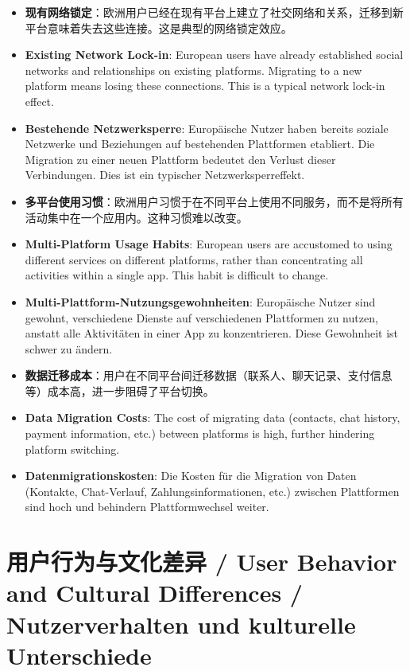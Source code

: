 \documentclass[11pt,a4paper]{article}
\begin{document}
\begin{itemize}
    \item \textbf{现有网络锁定}：欧洲用户已经在现有平台上建立了社交网络和关系，迁移到新平台意味着失去这些连接。这是典型的网络锁定效应。
    \item \textbf{Existing Network Lock-in}: European users have already established social networks and relationships on existing platforms. Migrating to a new platform means losing these connections. This is a typical network lock-in effect.
    \item \textbf{Bestehende Netzwerksperre}: Europäische Nutzer haben bereits soziale Netzwerke und Beziehungen auf bestehenden Plattformen etabliert. Die Migration zu einer neuen Plattform bedeutet den Verlust dieser Verbindungen. Dies ist ein typischer Netzwerksperreffekt.
    
    \item \textbf{多平台使用习惯}：欧洲用户习惯于在不同平台上使用不同服务，而不是将所有活动集中在一个应用内。这种习惯难以改变。
    \item \textbf{Multi-Platform Usage Habits}: European users are accustomed to using different services on different platforms, rather than concentrating all activities within a single app. This habit is difficult to change.
    \item \textbf{Multi-Plattform-Nutzungsgewohnheiten}: Europäische Nutzer sind gewohnt, verschiedene Dienste auf verschiedenen Plattformen zu nutzen, anstatt alle Aktivitäten in einer App zu konzentrieren. Diese Gewohnheit ist schwer zu ändern.
    
    \item \textbf{数据迁移成本}：用户在不同平台间迁移数据（联系人、聊天记录、支付信息等）成本高，进一步阻碍了平台切换。
    \item \textbf{Data Migration Costs}: The cost of migrating data (contacts, chat history, payment information, etc.) between platforms is high, further hindering platform switching.
    \item \textbf{Datenmigrationskosten}: Die Kosten für die Migration von Daten (Kontakte, Chat-Verlauf, Zahlungsinformationen, etc.) zwischen Plattformen sind hoch und behindern Plattformwechsel weiter.
\end{itemize}

\section{用户行为与文化差异 / User Behavior and Cultural Differences / Nutzerverhalten und kulturelle Unterschiede}
\end{document}
